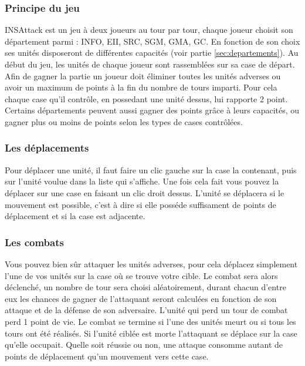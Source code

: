 \subsubsection{Principe du jeu}
INSAttack est un jeu à deux joueurs au tour par tour, chaque joueur choisit son département parmi : INFO, EII, SRC, SGM, GMA, GC. En fonction de son choix ses unités disposeront de différentes capacités (voir partie \ref{sec:departements}). Au début du jeu, les unités de chaque joueur sont rassemblées sur sa case de départ. Afin de gagner la partie un joueur doit éliminer toutes les unités adverses ou avoir un maximum de points à la fin du nombre de tours imparti. Pour cela chaque case qu'il contrôle, en possedant une unité dessus, lui rapporte 2 point. Certains départements peuvent aussi gagner des points grâce à leurs capacités, ou gagner plus ou moins de points selon les types de cases contrôlées.

\subsubsection{Les déplacements}
Pour déplacer une unité, il faut faire un clic gauche sur la case la contenant, puis sur l'unité voulue dans la liste qui s'affiche. Une fois cela fait vous pouvez la déplacer sur une case en faisant un clic droit dessus. L'unité se déplacera si le mouvement est possible, c'est à dire si elle posséde suffisament de points de déplacement et si la case est adjacente.

\subsubsection{Les combats}
Vous pouvez bien sûr attaquer les unités adverses, pour cela déplacez simplement l'une de vos unités sur la case où se trouve votre cible. Le combat sera alors déclenché, un nombre de tour sera choisi aléatoirement, durant chacun d'entre eux les chances de gagner de l'attaquant seront calculées en fonction de son attaque et de la défense de son adversaire. L'unité qui perd un tour de combat perd 1 point de vie. Le combat se termine si l'une des unités meurt ou si tous les tours ont été réalisés. Si l'unité ciblée est morte l'attaquant se déplace sur la case qu'elle occupait. Quelle soit réussie ou non, une attaque consomme autant de points de déplacement qu'un mouvement vers cette case.